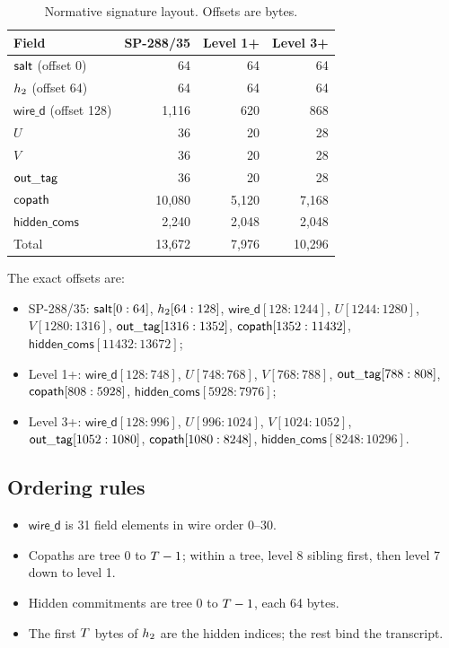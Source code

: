 \documentclass[11pt,a4paper]{article}
\begin{document}
\begin{table}[ht]
\centering
\small
\caption{Normative signature layout. Offsets are bytes.}
\label{tab:layout}
\begin{tabular}{@{}lrrr@{}}
\toprule
Field & SP-288/35 & Level 1+ & Level 3+ \\
\midrule
$\mathsf{salt}$ (offset 0) & 64 & 64 & 64 \\
$h_2$ (offset 64) & 64 & 64 & 64 \\
$\mathsf{wire\_d}$ (offset 128) & 1,116 & 620 & 868 \\
$U$ & 36 & 20 & 28 \\
$V$ & 36 & 20 & 28 \\
$\mathsf{out\_tag}$ & 36 & 20 & 28 \\
$\mathsf{copath}$ & 10,080 & 5,120 & 7,168 \\
$\mathsf{hidden\_coms}$ & 2,240 & 2,048 & 2,048 \\
\midrule
Total & 13,672 & 7,976 & 10,296 \\
\bottomrule
\end{tabular}
\end{table}

The exact offsets are:
\begin{itemize}
  \item SP-288/35: $\mathsf{salt}[0:64]$, $h_2[64:128]$, $\mathsf{wire\_d}[128:1244]$,
        $U[1244:1280]$, $V[1280:1316]$, $\mathsf{out\_tag}[1316:1352]$,
        $\mathsf{copath}[1352:11432]$, $\mathsf{hidden\_coms}[11432:13672]$;
  \item Level 1+: $\mathsf{wire\_d}[128:748]$, $U[748:768]$, $V[768:788]$,
        $\mathsf{out\_tag}[788:808]$, $\mathsf{copath}[808:5928]$,
        $\mathsf{hidden\_coms}[5928:7976]$;
  \item Level 3+: $\mathsf{wire\_d}[128:996]$, $U[996:1024]$, $V[1024:1052]$,
        $\mathsf{out\_tag}[1052:1080]$, $\mathsf{copath}[1080:8248]$,
        $\mathsf{hidden\_coms}[8248:10296]$.
\end{itemize}

\subsection{Ordering rules}

\begin{itemize}
  \item $\mathsf{wire\_d}$ is 31 field elements in wire order 0--30.
  \item Copaths are tree 0 to $T-1$; within a tree, level 8 sibling first,
        then level 7 down to level 1.
  \item Hidden commitments are tree 0 to $T-1$, each 64 bytes.
  \item The first $T$ bytes of $h_2$ are the hidden indices; the rest
        bind the transcript.
\end{itemize}
\end{document}
